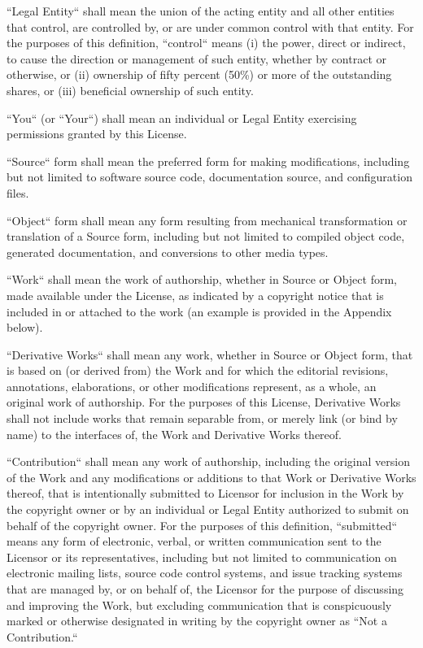 \documentclass[a4paper, 11pt, twoside]{article}
\begin{document}
“Legal Entity“ shall mean the union of the acting entity and all other entities that control, are controlled by, or are under common control with that entity. For the purposes of this definition, “control“ means (i) the power, direct or indirect, to cause the direction or management of such entity, whether by contract or otherwise, or (ii) ownership of fifty percent (50\%) or more of the outstanding shares, or (iii) beneficial ownership of such entity.

“You“ (or “Your“) shall mean an individual or Legal Entity exercising permissions granted by this License.

“Source“ form shall mean the preferred form for making modifications, including but not limited to software source code, documentation source, and configuration files.

“Object“ form shall mean any form resulting from mechanical transformation or translation of a Source form, including but not limited to compiled object code, generated documentation, and conversions to other media types.

“Work“ shall mean the work of authorship, whether in Source or Object form, made available under the License, as indicated by a copyright notice that is included in or attached to the work (an example is provided in the Appendix below).

“Derivative Works“ shall mean any work, whether in Source or Object form, that is based on (or derived from) the Work and for which the editorial revisions, annotations, elaborations, or other modifications represent, as a whole, an original work of authorship. For the purposes of this License, Derivative Works shall not include works that remain separable from, or merely link (or bind by name) to the interfaces of, the Work and Derivative Works thereof.

“Contribution“ shall mean any work of authorship, including the original version of the Work and any modifications or additions to that Work or Derivative Works thereof, that is intentionally submitted to Licensor for inclusion in the Work by the copyright owner or by an individual or Legal Entity authorized to submit on behalf of the copyright owner. For the purposes of this definition, “submitted“ means any form of electronic, verbal, or written communication sent to the Licensor or its representatives, including but not limited to communication on electronic mailing lists, source code control systems, and issue tracking systems that are managed by, or on behalf of, the Licensor for the purpose of discussing and improving the Work, but excluding communication that is conspicuously marked or otherwise designated in writing by the copyright owner as “Not a Contribution.“
\end{document}
